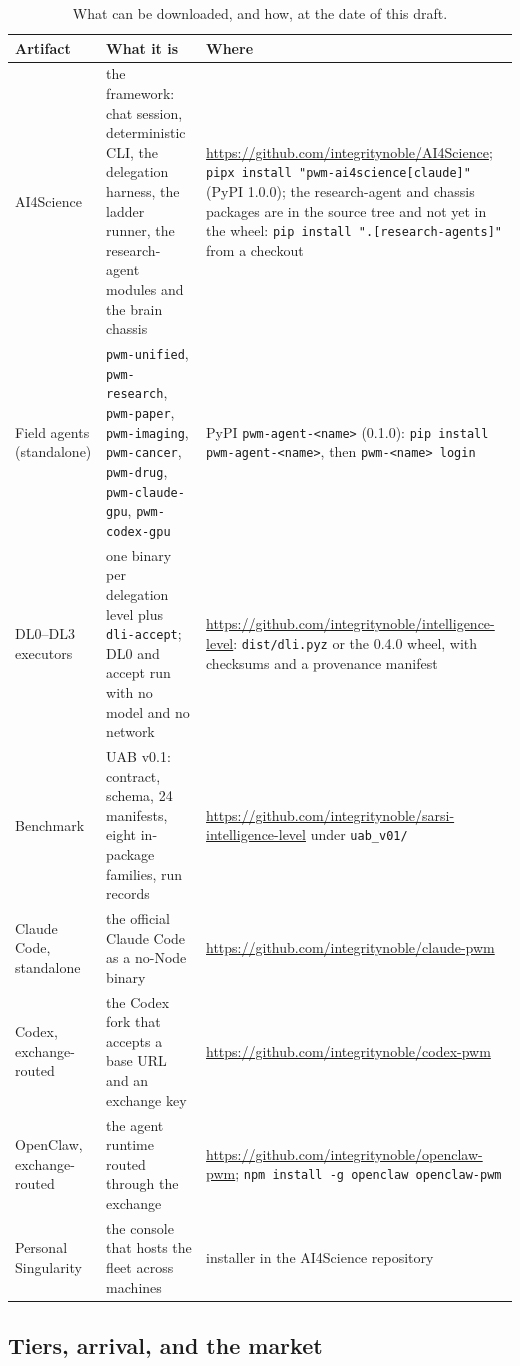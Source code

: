 \begin{table}[!htbp]
\centering\footnotesize
\begin{tabularx}{\textwidth}{@{}lYY@{}}
\toprule
Artifact & What it is & Where \\
\midrule
AI4Science & the framework: chat session, deterministic CLI, the delegation harness, the ladder runner, the research-agent modules and the brain chassis & \url{https://github.com/integritynoble/AI4Science}; \texttt{pipx install "pwm-ai4science[claude]"} (PyPI 1.0.0); the research-agent and chassis packages are in the source tree and not yet in the wheel: \texttt{pip install ".[research-agents]"} from a checkout \\
Field agents (standalone) & \texttt{pwm-unified}, \texttt{pwm-research}, \texttt{pwm-paper}, \texttt{pwm-imaging}, \texttt{pwm-cancer}, \texttt{pwm-drug}, \texttt{pwm-claude-gpu}, \texttt{pwm-codex-gpu} & PyPI \texttt{pwm-agent-<name>} (0.1.0): \texttt{pip install pwm-agent-<name>}, then \texttt{pwm-<name> login} \\
DL0--DL3 executors & one binary per delegation level plus \texttt{dli-accept}; DL0 and accept run with no model and no network & \url{https://github.com/integritynoble/intelligence-level}: \texttt{dist/dli.pyz} or the 0.4.0 wheel, with checksums and a provenance manifest \\
Benchmark & UAB v0.1: contract, schema, 24 manifests, eight in-package families, run records & \url{https://github.com/integritynoble/sarsi-intelligence-level} under \texttt{uab\_v01/} \\
Claude Code, standalone & the official Claude Code as a no-Node binary & \url{https://github.com/integritynoble/claude-pwm} \\
Codex, exchange-routed & the Codex fork that accepts a base URL and an exchange key & \url{https://github.com/integritynoble/codex-pwm} \\
OpenClaw, exchange-routed & the agent runtime routed through the exchange & \url{https://github.com/integritynoble/openclaw-pwm}; \texttt{npm install -g openclaw openclaw-pwm} \\
Personal Singularity & the console that hosts the fleet across machines & installer in the AI4Science repository \\
\bottomrule
\end{tabularx}
\caption{What can be downloaded, and how, at the date of this draft.}
\label{tab:downloads}
\end{table}

\subsection{Tiers, arrival, and the market}\label{sec:tiers}

